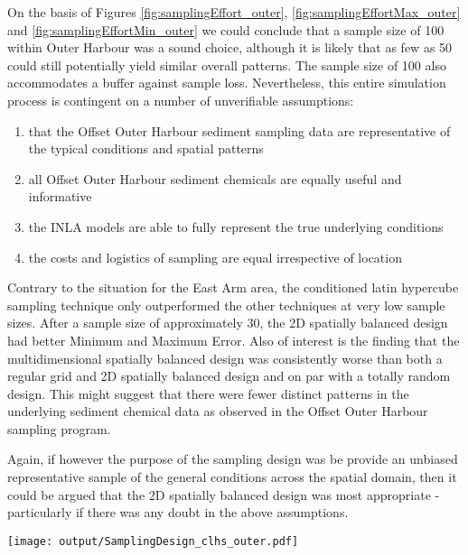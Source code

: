 \documentclass[a4paper]{article}
\let\origfigure=\figure
\let\endorigfigure=\endfigure
\renewenvironment{figure}[1][]{%
   \origfigure[H]
}{%
   \endorigfigure
}
\begin{document}
On the basis of Figures \ref{fig:samplingEffort_outer},
\ref{fig:samplingEffortMax_outer} and \ref{fig:samplingEffortMin_outer}
we could conclude that a sample size of 100 within Outer Harbour was a
sound choice, although it is likely that as few as 50 could still
potentially yield similar overall patterns. The sample size of 100 also
accommodates a buffer against sample loss. Nevertheless, this entire
simulation process is contingent on a number of unverifiable
assumptions:

\begin{enumerate}
\def\labelenumi{\arabic{enumi}.}
\tightlist
\item
  that the Offset Outer Harbour sediment sampling data are
  representative of the typical conditions and spatial patterns
\item
  all Offset Outer Harbour sediment chemicals are equally useful and
  informative
\item
  the INLA models are able to fully represent the true underlying
  conditions
\item
  the costs and logistics of sampling are equal irrespective of location
\end{enumerate}

Contrary to the situation for the East Arm area, the conditioned latin
hypercube sampling technique only outperformed the other techniques at
very low sample sizes. After a sample size of approximately 30, the 2D
spatially balanced design had better Minimum and Maximum Error. Also of
interest is the finding that the multidimensional spatially balanced
design was consistently worse than both a regular grid and 2D spatially
balanced design and on par with a totally random design. This might
suggest that there were fewer distinct patterns in the underlying
sediment chemical data as observed in the Offset Outer Harbour sampling
program.

Again, if however the purpose of the sampling design was be provide an
unbiased representative sample of the general conditions across the
spatial domain, then it could be argued that the 2D spatially balanced
design was most appropriate - particularly if there was any doubt in the
above assumptions.

\begin{figure}
\centering\scriptsize
\texttt{[image: output/SamplingDesign\_clhs\_outer.pdf]}
\caption{Sampling configurations associated with the lowest mean Error
for each sample size for cLHS for the Outer
Harbour\label{fig:SamplingDesign_clhs_outer}}
\end{figure}
\end{document}
